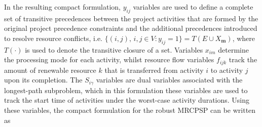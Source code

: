 \documentclass[a4paper,abstracton]{scrartcl}
\begin{document}
In the resulting compact formulation, $y_{ij}$ variables are used to define a complete set of transitive precedences between the project activities that are formed by the original project precedence constraints and the additional precedences introduced to resolve resource conflicts, i.e. $\{(i,j),\, i,j\in V:y_{ij}=1\}=T(E\cup X_{\bm{m}})$, where $T(\cdot)$ is used to denote the transitive closure of a set. Variables $x_{im}$ determine the processing mode for each activity, whilst resource flow variables $f_{ijk}$ track the amount of renewable resource $k$ that is transferred from activity $i$ to activity $j$ upon its completion. The $S_{i\gamma}$ variables are dual variables associated with the longest-path subproblem, which in this formulation these variables are used to track the start time of activities under the worst-case activity durations. Using these variables, the compact formulation for the robust MRCPSP can be written as   
\end{document}
